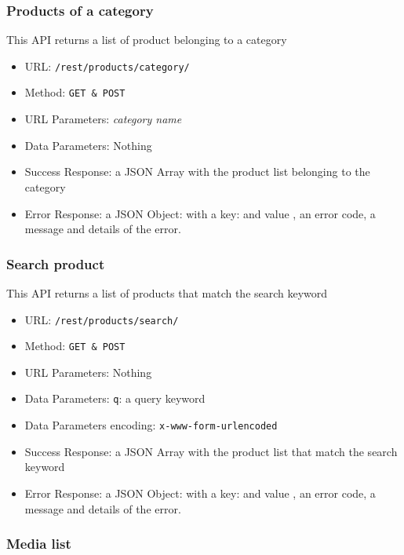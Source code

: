 \subsubsection*{Products of a category}

This API returns a list of product belonging to a category

\begin{itemize}
    \item URL: \texttt{/rest/products/category/}
    \item Method: \texttt{GET \& POST}
    \item URL Parameters: \textit{category name}
    \item Data Parameters: Nothing
    \item Success Response: a JSON Array with the product list  belonging to the category
    \item Error Response: a JSON Object: with a key:   and value , an error code, a message and details of the error.
\end{itemize}

\subsubsection*{Search product}

This API returns a list of products that match the search keyword

\begin{itemize}
    \item URL: \texttt{/rest/products/search/}
    \item Method: \texttt{GET \& POST}
    \item URL Parameters: Nothing
    \item Data Parameters: \texttt{q}: a query keyword
    \item Data Parameters encoding: \texttt{x-www-form-urlencoded}
    \item Success Response: a JSON Array with the product list  that match the search keyword
    \item Error Response: a JSON Object: with a key:   and value , an error code, a message and details of the error.
\end{itemize}

\subsubsection*{Media list}

